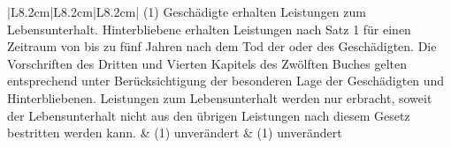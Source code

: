 \documentclass[10pt,a4paper,landscape]{article}
\begin{document}
\begin{longtable}{|L{8.2cm}|L{8.2cm}|L{8.2cm}|}
\hhline{|---|}
(1) Geschädigte erhalten Leistungen zum  \newline Lebensunterhalt. Hinterbliebene erhalten  \newline Leistungen nach Satz 1 für einen Zeitraum  \newline von bis zu fünf Jahren nach dem Tod der  \newline oder des Geschädigten. Die Vorschriften  \newline des Dritten und Vierten Kapitels des  \newline Zwölften Buches gelten entsprechend unter  \newline Berücksichtigung der besonderen Lage der  \newline Geschädigten und Hinterbliebenen.  \newline Leistungen zum Lebensunterhalt werden  \newline nur erbracht, soweit der Lebensunterhalt  \newline nicht aus den übrigen Leistungen nach  \newline diesem Gesetz bestritten werden kann. & (1) unverändert & (1) unverändert \\
\hhline{|---|}

\end{longtable}
\end{document}
